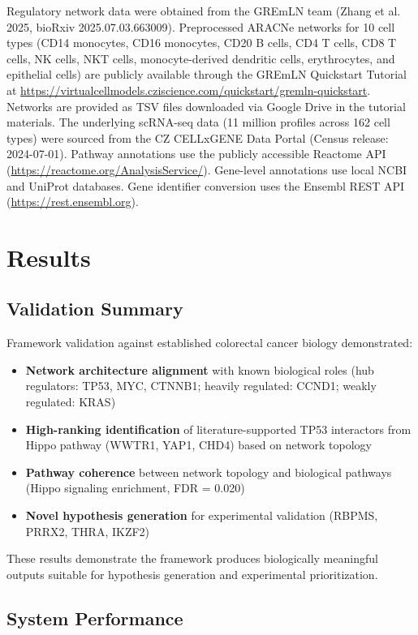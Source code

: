 \documentclass[11pt]{article}
\begin{document}
Regulatory network data were obtained from the GREmLN team (Zhang et al. 2025, bioRxiv 2025.07.03.663009). Preprocessed ARACNe networks for 10 cell types (CD14 monocytes, CD16 monocytes, CD20 B cells, CD4 T cells, CD8 T cells, NK cells, NKT cells, monocyte-derived dendritic cells, erythrocytes, and epithelial cells) are publicly available through the GREmLN Quickstart Tutorial at \url{https://virtualcellmodels.cziscience.com/quickstart/gremln-quickstart}. Networks are provided as TSV files downloaded via Google Drive in the tutorial materials. The underlying scRNA-seq data (11 million profiles across 162 cell types) were sourced from the CZ CELLxGENE Data Portal (Census release: 2024-07-01). Pathway annotations use the publicly accessible Reactome API (\url{https://reactome.org/AnalysisService/}). Gene-level annotations use local NCBI and UniProt databases. Gene identifier conversion uses the Ensembl REST API (\url{https://rest.ensembl.org}).

\section{Results}

\subsection{Validation Summary}

Framework validation against established colorectal cancer biology demonstrated:
\begin{itemize}
\item \textbf{Network architecture alignment} with known biological roles (hub regulators: TP53, MYC, CTNNB1; heavily regulated: CCND1; weakly regulated: KRAS)
\item \textbf{High-ranking identification} of literature-supported TP53 interactors from Hippo pathway (WWTR1, YAP1, CHD4) based on network topology
\item \textbf{Pathway coherence} between network topology and biological pathways (Hippo signaling enrichment, FDR = 0.020)
\item \textbf{Novel hypothesis generation} for experimental validation (RBPMS, PRRX2, THRA, IKZF2)
\end{itemize}

These results demonstrate the framework produces biologically meaningful outputs suitable for hypothesis generation and experimental prioritization.

\subsection{System Performance}
\end{document}
